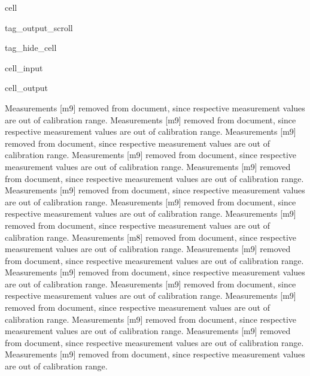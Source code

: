 \documentclass[letterpaper,10pt,english]{jupyterBook}
\begin{document}
\begin{sphinxuseclass}{cell}
\begin{sphinxuseclass}{tag_output_scroll}
\begin{sphinxuseclass}{tag_hide_cell}
\begin{sphinxVerbatimInput}
\begin{sphinxuseclass}{cell_input}
\end{sphinxuseclass}\end{sphinxVerbatimInput}
\begin{sphinxVerbatimOutput}

\begin{sphinxuseclass}{cell_output}
\begin{sphinxVerbatim}[commandchars=\\\{\}]
Measurements \PYGZsq{}[\PYGZsq{}m9\PYGZsq{}]\PYGZsq{} removed from document, since respective measurement values are out of calibration range.
Measurements \PYGZsq{}[\PYGZsq{}m9\PYGZsq{}]\PYGZsq{} removed from document, since respective measurement values are out of calibration range.
Measurements \PYGZsq{}[\PYGZsq{}m9\PYGZsq{}]\PYGZsq{} removed from document, since respective measurement values are out of calibration range.
Measurements \PYGZsq{}[\PYGZsq{}m9\PYGZsq{}]\PYGZsq{} removed from document, since respective measurement values are out of calibration range.
Measurements \PYGZsq{}[\PYGZsq{}m9\PYGZsq{}]\PYGZsq{} removed from document, since respective measurement values are out of calibration range.
Measurements \PYGZsq{}[\PYGZsq{}m9\PYGZsq{}]\PYGZsq{} removed from document, since respective measurement values are out of calibration range.
Measurements \PYGZsq{}[\PYGZsq{}m9\PYGZsq{}]\PYGZsq{} removed from document, since respective measurement values are out of calibration range.
Measurements \PYGZsq{}[\PYGZsq{}m9\PYGZsq{}]\PYGZsq{} removed from document, since respective measurement values are out of calibration range.
Measurements \PYGZsq{}[\PYGZsq{}m8\PYGZsq{}]\PYGZsq{} removed from document, since respective measurement values are out of calibration range.
Measurements \PYGZsq{}[\PYGZsq{}m9\PYGZsq{}]\PYGZsq{} removed from document, since respective measurement values are out of calibration range.
Measurements \PYGZsq{}[\PYGZsq{}m9\PYGZsq{}]\PYGZsq{} removed from document, since respective measurement values are out of calibration range.
Measurements \PYGZsq{}[\PYGZsq{}m9\PYGZsq{}]\PYGZsq{} removed from document, since respective measurement values are out of calibration range.
Measurements \PYGZsq{}[\PYGZsq{}m9\PYGZsq{}]\PYGZsq{} removed from document, since respective measurement values are out of calibration range.
Measurements \PYGZsq{}[\PYGZsq{}m9\PYGZsq{}]\PYGZsq{} removed from document, since respective measurement values are out of calibration range.
Measurements \PYGZsq{}[\PYGZsq{}m9\PYGZsq{}]\PYGZsq{} removed from document, since respective measurement values are out of calibration range.
Measurements \PYGZsq{}[\PYGZsq{}m9\PYGZsq{}]\PYGZsq{} removed from document, since respective measurement values are out of calibration range.

\end{sphinxVerbatim}
\end{sphinxuseclass}
\end{sphinxVerbatimOutput}
\end{sphinxuseclass}
\end{sphinxuseclass}
\end{sphinxuseclass}
\end{document}
